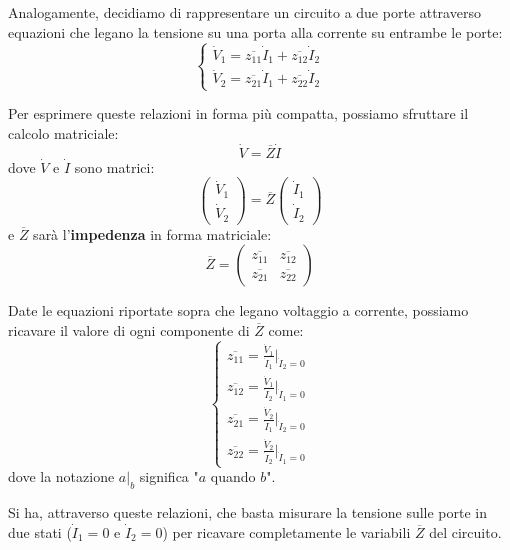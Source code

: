 \documentclass[a4paper,11pt]{article}
\begin{document}
Analogamente, decidiamo di rappresentare un circuito a due porte attraverso equazioni che legano la tensione su una porta alla corrente su entrambe le porte:
\[
	\begin{cases}
		\dot{V}_1 = \overline{z_{11}} \dot{I}_1 + \overline{z_{12}} \dot{I}_2 \\ 	
		\dot{V}_2 = \overline{z_{21}} \dot{I}_1 + \overline{z_{22}} \dot{I}_2 	
	\end{cases}
\]

Per esprimere queste relazioni in forma più compatta, possiamo sfruttare il calcolo matriciale:
$$
\dot{V} = \overline{Z} \dot{I}
$$
dove $\dot{V}$ e $\dot{I}$ sono matrici:
$$
\begin{pmatrix}
	\dot{V}_1 \\ \dot{V}_2
\end{pmatrix}
= \overline{Z}
\begin{pmatrix}
	\dot{I}_1 \\ \dot{I}_2
\end{pmatrix}
$$
e $\overline{Z}$ sarà l'\textbf{impedenza} in forma matriciale:
$$
\overline{Z} =
\begin{pmatrix}
	\overline{z_{11}} & \overline{z_{12}} \\ 
	\overline{z_{21}} & \overline{z_{22}} 
\end{pmatrix}
$$

Date le equazioni riportate sopra che legano voltaggio a corrente, possiamo ricavare il valore di ogni componente di $\overline{Z}$ come:
\[
	\begin{cases}
		\overline{z_{11}} = \frac{\dot{V}_1}{\dot{I}_1} \Big|_{\dot{I}_2 = 0} \\
		\overline{z_{12}} = \frac{\dot{V}_1}{\dot{I}_2} \Big|_{\dot{I}_1 = 0} \\
		\overline{z_{21}} = \frac{\dot{V}_2}{\dot{I}_1} \Big|_{\dot{I}_2 = 0} \\
		\overline{z_{22}} = \frac{\dot{V}_2}{\dot{I}_2} \Big|_{\dot{I}_1 = 0}
	\end{cases}
\]
dove la notazione $a \Big|_b$ significa "$a$ quando $b$".

Si ha, attraverso queste relazioni, che basta misurare la tensione sulle porte in due stati ($\dot{I}_1 = 0$ e $\dot{I}_2 = 0$) per ricavare completamente le variabili $\overline{Z}$ del circuito.
\end{document}
